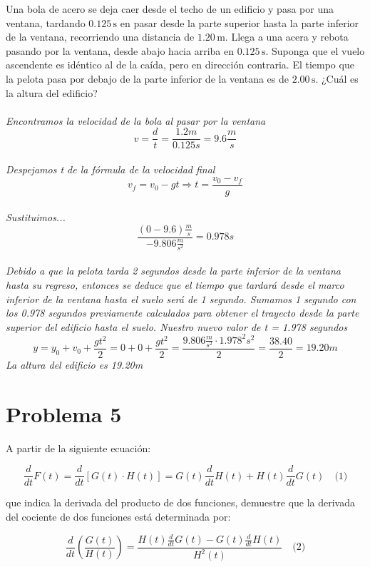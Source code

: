 \documentclass{article}
\begin{document}
Una bola de acero se deja caer desde el techo de un edificio y pasa por una ventana, tardando $0.125 \, \text{s}$ en pasar desde la parte superior hasta la parte inferior de la ventana, recorriendo una distancia de $1.20 \, \text{m}$. Llega a una acera y rebota pasando por la ventana, desde abajo hacia arriba en $0.125 \, \text{s}$. Suponga que el vuelo ascendente es idéntico al de la caída, pero en dirección contraria. El tiempo que la pelota pasa por debajo de la parte inferior de la ventana es de $2.00 \, \text{s}$. ¿Cuál es la altura del edificio?\\\\
\textit{Encontramos la velocidad de la bola al pasar por la ventana}
\[
v = \frac{d}{t} = \frac{1.2m}{0.125s} = 9.6 \frac{m}{s}
\] \\
\textit{Despejamos t de la fórmula de la velocidad final}
\[
v_f = v_0 - gt \Rightarrow t = \frac{v_0 - v_f}{g}
\] \\
\textit{Sustituimos...}
\[
\frac{(0-9.6)\frac{m}{s}}{-9.806\frac{m}{s^2}} = 0.978s
\] \\
\textit{Debido a que la pelota tarda 2 segundos desde la parte inferior de la ventana hasta su regreso, entonces se deduce que el tiempo que tardará desde el marco inferior de la ventana hasta el suelo será de 1 segundo. Sumamos 1 segundo con los 0.978 segundos previamente calculados para obtener el trayecto desde la parte superior del edificio hasta el suelo. Nuestro nuevo valor de t = 1.978 segundos}
\[
y = y_0 + v_0 + \frac{gt^2}{2} = 0 + 0 + \frac{gt^2}{2} = \frac{9.806\frac{m}{s^2} \cdot 1.978^2s^2}{2} = \frac{38.40}{2} = 19.20m
\]
\textit{La altura del edificio es 19.20m}

\section*{Problema 5}



\noindent A partir de la siguiente ecuación:

\[
\frac{d}{dt}F(t) = \frac{d}{dt}[G(t) \cdot H(t)] = G(t) \frac{d}{dt}H(t) + H(t) \frac{d}{dt}G(t) \quad \text{(1)}
\]

\noindent que indica la derivada del producto de dos funciones, demuestre que la derivada del cociente de dos funciones está determinada por:

\[
\frac{d}{dt}\left(\frac{G(t)}{H(t)}\right) = \frac{H(t)\frac{d}{dt}G(t) - G(t)\frac{d}{dt}H(t)}{H^2(t)} \quad \text{(2)}
\]
\end{document}
